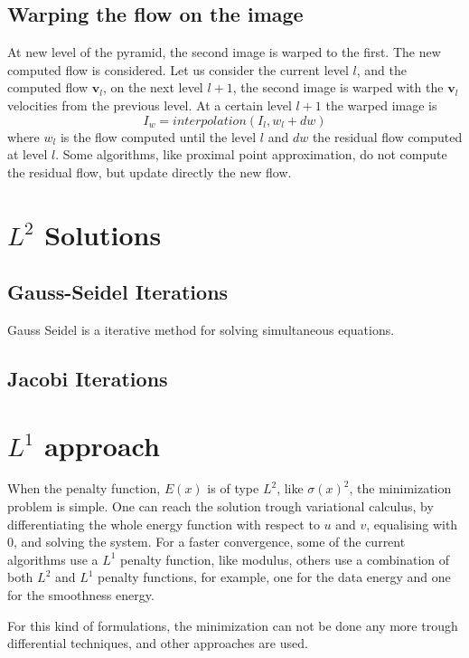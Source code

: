 \documentclass[12pt,a4paper,twoside]{report}
\begin{document}
\subsection{Warping the flow on the image}


At new level of the pyramid, the second image is warped to the first.
The new computed flow is considered.
Let us consider the current level $l$, and the computed flow $\boldsymbol{v}_l$, on the next level $l+1$, the second image is warped with the $\boldsymbol{v}_l$ velocities from the previous level.
At a certain level $l+1$ the warped image is 
\begin{equation}
I_w = interpolation(I_l, w_l+dw)
\end{equation}
where $w_l$ is the flow computed until the level $l$ and $dw$ the  residual flow computed at level $l$. Some algorithms, like proximal point approximation, do not compute the residual flow, but update directly the new flow.

\section{$L^2$ Solutions}
\subsection{Gauss-Seidel Iterations} \label{GaussSeidel}
Gauss Seidel is a iterative method for solving simultaneous equations.
\subsection{Jacobi Iterations}
\section{$L^1$ approach}

When the penalty function, $E(x)$ is of type $L^2$, like $\sigma(x)^2$,  the minimization problem is simple. One can reach the solution trough variational calculus, by differentiating the whole energy function with respect to $u$ and $v$, equalising with 0, and solving the system.  
For a faster convergence, some of the current algorithms use a $L^1$ penalty function, like modulus, others use a combination of both $L^2$ and $L^1$ penalty functions, for example, one for the data energy and one for the smoothness energy.

For this kind of formulations, the minimization can not be done any more trough differential techniques, and other approaches are used.
\end{document}
